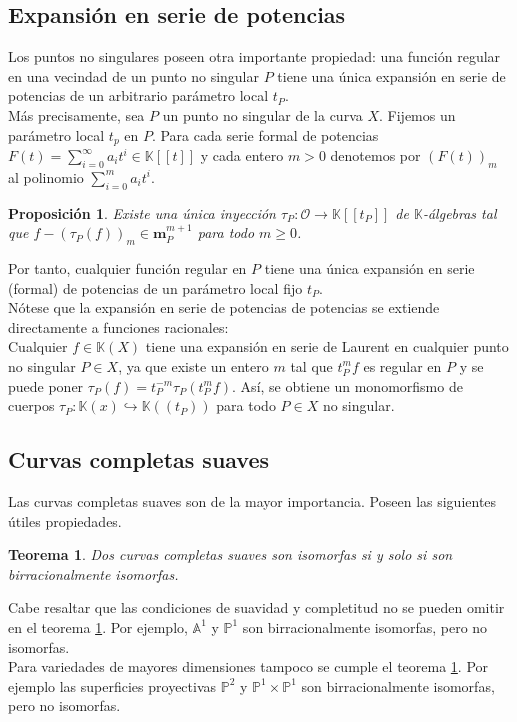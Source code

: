 \documentclass[12pt,a4paper]{report}
\newcommand{\msp}{\mathbf{m}_{P}}
\newcommand{\Ou}{\mathscr{O}}
\newcommand{\K}{\mathbb{K}}
\newtheorem{teo}{Teorema}[chapter]
\newtheorem{prop}{Proposición}[chapter]
\begin{document}
\subsection{Expansión en serie de potencias}
Los puntos no singulares poseen otra importante propiedad: una función regular en una vecindad de un punto no singular $P$ tiene una única expansión en serie de potencias de un arbitrario parámetro local $t_{P}$.\\

Más precisamente, sea $P$ un punto no singular de la curva $X$. Fijemos un parámetro local $t_{p}$ en $P$. Para cada serie formal de potencias $F(t) = \sum_{i=0}^{\infty} a_{i} t^{i} \in \K [[t]]$ y cada entero $m>0$ denotemos por $(F(t))_{m}$ al polinomio $\sum_{i=0}^{m} a_{i} t^{i}$.

\begin{prop}\label{2.1.44}
	Existe una única inyección $\tau_{P}: \Ou \rightarrow \K[[t_{P}]]$ de $\K$-álgebras tal que $f-(\tau_{P}(f))_{m} \in \msp ^{m+1}$ para todo $m \geq 0$.
\end{prop}

Por tanto, cualquier función regular en $P$ tiene una única expansión en serie (formal) de potencias de un parámetro local fijo $t_{P}$.\\

Nótese que la expansión en serie de potencias de potencias se extiende directamente a funciones racionales: \\
Cualquier $f\in \K(X)$ tiene una expansión en serie de Laurent en cualquier punto no singular $P \in X$, ya que existe un entero $m$ tal que $t_{P}^{m}f$ es regular en $P$ y se puede poner $\tau_{P}(f)= t_{P}^{-m} \tau_{P} (t_{P}^{m}f)$. Así, se obtiene un monomorfismo de cuerpos $\tau_{P}: \K(x) \hookrightarrow \K((t_{P})) $ para todo $P \in X$ no singular.


\subsection{Curvas completas suaves}
Las curvas completas suaves son de la mayor importancia. Poseen las siguientes útiles propiedades.

\begin{teo}\label{2.1.46}
	Dos curvas completas suaves son isomorfas si y solo si son birracionalmente isomorfas.
\end{teo}

Cabe resaltar que las condiciones de suavidad y completitud no se pueden omitir en el teorema \ref{2.1.46}. Por ejemplo, $\mathbb{A}^{1}$ y  $\mathbb{P}^{1}$ son birracionalmente isomorfas, pero no isomorfas.\\
Para variedades de mayores dimensiones tampoco se cumple el teorema \ref{2.1.46}. Por ejemplo las superficies proyectivas $\mathbb{P}^{2}$ y $\mathbb{P}^{1}\times \mathbb{P}^{1}$ son birracionalmente isomorfas, pero no isomorfas.\\
\end{document}
